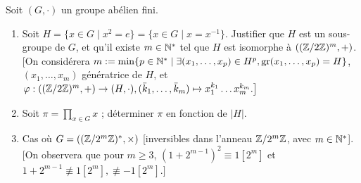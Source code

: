 

\begin{statementbox}
Soit $(G, \cdot)$ un groupe abélien fini.
\begin{enumerate}[label=\alph*)]
  \item Soit $H = \{x \in G \mid x^2 = e\} = \{x \in G \mid x = x^{-1}\}$. Justifier que $H$ est un sous-groupe de $G$, et qu'il existe $m \in \mathbb N^*$ tel que $H$ est isomorphe à $\left((\mathbb Z/2\mathbb Z)^m, +\right)$. \\
  $\big[$On considérera $m := \min \{p \in \mathbb N^* \mid \exists (x_1, \dots, x_p) \in H^p, \operatorname{gr}(x_1, \dots, x_p) = H\}$, $(x_1, \dots, x_m)$ génératrice de $H$, et $\varphi : \left((\mathbb Z/2\mathbb Z)^m, +\right) \to (H, \cdot), (\bar{k}_1, \dots, \bar{k}_m) \mapsto x_1^{k_1} \dots x_m^{k_m}.\big]$
  \item Soit $\pi = \prod_{x \in G} x$ ; déterminer $\pi$ en fonction de $|H|$.
  \item Cas où $G = \left((\mathbb Z/2^m\mathbb Z)^*, \times\right)$ [inversibles dans l'anneau $\mathbb Z/2^m\mathbb Z$, avec $m \in \mathbb N^*$]. \\
  $\big[$On observera que pour $m \geq 3$, $(1+2^{m-1})^2 \equiv 1 [2^m]$ et $1+2^{m-1} \not\equiv 1 [2^m], \not\equiv -1 [2^m].\big]$
\end{enumerate}
\end{statementbox}

